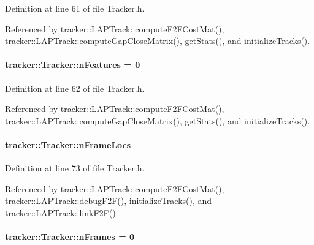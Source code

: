 Definition at line 61 of file Tracker.\+h.



Referenced by tracker\+::\+L\+A\+P\+Track\+::compute\+F2\+F\+Cost\+Mat(), tracker\+::\+L\+A\+P\+Track\+::compute\+Gap\+Close\+Matrix(), get\+Stats(), and initialize\+Tracks().

\paragraph[{\texorpdfstring{n\+Features}{nFeatures}}]{ tracker\+::\+Tracker\+::n\+Features = 0}\hypertarget{classtracker_1_1Tracker_ade0b77f0b5ffc71aecddc70593ec16bb}{}\label{classtracker_1_1Tracker_ade0b77f0b5ffc71aecddc70593ec16bb}


Definition at line 62 of file Tracker.\+h.



Referenced by tracker\+::\+L\+A\+P\+Track\+::compute\+F2\+F\+Cost\+Mat(), tracker\+::\+L\+A\+P\+Track\+::compute\+Gap\+Close\+Matrix(), get\+Stats(), and initialize\+Tracks().

\paragraph[{\texorpdfstring{n\+Frame\+Locs}{nFrameLocs}}]{ tracker\+::\+Tracker\+::n\+Frame\+Locs}\hypertarget{classtracker_1_1Tracker_a84d3000b7a2b7a2566791f05d3b8afcb}{}\label{classtracker_1_1Tracker_a84d3000b7a2b7a2566791f05d3b8afcb}


Definition at line 73 of file Tracker.\+h.



Referenced by tracker\+::\+L\+A\+P\+Track\+::compute\+F2\+F\+Cost\+Mat(), tracker\+::\+L\+A\+P\+Track\+::debug\+F2\+F(), initialize\+Tracks(), and tracker\+::\+L\+A\+P\+Track\+::link\+F2\+F().

\paragraph[{\texorpdfstring{n\+Frames}{nFrames}}]{ tracker\+::\+Tracker\+::n\+Frames = 0}\hypertarget{classtracker_1_1Tracker_a103afa608ae5693103d81e040a9e29d6}{}\label{classtracker_1_1Tracker_a103afa608ae5693103d81e040a9e29d6}


